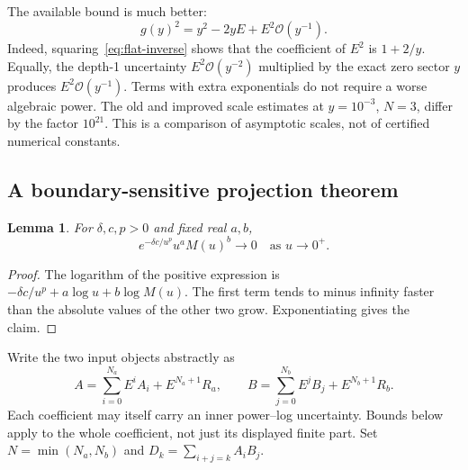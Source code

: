 \documentclass[11pt,letterpaper]{article}
\newcommand{\OO}{\mathcal O}
\newtheorem{lemma}[proposition]{Lemma}
\begin{document}
The available bound is much better:
\begin{equation}
 g(y)^2=y^2-2yE+E^2\OO(y^{-1}).
 \label{eq:sharp-product}
\end{equation}
Indeed, squaring~\eqref{eq:flat-inverse} shows that the coefficient of $E^2$ is
$1+2/y$. Equally, the depth-1 uncertainty $E^2\OO(y^{-2})$ multiplied by the
exact zero sector $y$ produces $E^2\OO(y^{-1})$. Terms with extra exponentials
do not require a worse algebraic power. The old and improved scale estimates
at $y=10^{-3}$, $N=3$, differ by the factor $10^{21}$. This is a comparison
of asymptotic scales, not of certified numerical constants.

\subsection{A boundary-sensitive projection theorem}
\begin{lemma}\label{lem:absorb}
For $\delta,c,p>0$ and fixed real $a,b$,
\[
 e^{-\delta c/u^p}u^aM(u)^b\longrightarrow0
 \quad\text{as }u\to0^+.
\]
\end{lemma}
\begin{proof}
The logarithm of the positive expression is
$-\delta c/u^p+a\log u+b\log M(u)$. The first term tends to minus infinity
faster than the absolute values of the other two grow. Exponentiating gives
the claim.
\end{proof}

Write the two input objects abstractly as
\[
 A=\sum_{i=0}^{N_a}E^i A_i+E^{N_a+1}R_a,
 \qquad
 B=\sum_{j=0}^{N_b}E^j B_j+E^{N_b+1}R_b.
\]
Each coefficient may itself carry an inner power--log uncertainty. Bounds
below apply to the whole coefficient, not just its displayed finite part.
Set $N=\min(N_a,N_b)$ and $D_k=\sum_{i+j=k}A_iB_j$.
\end{document}
